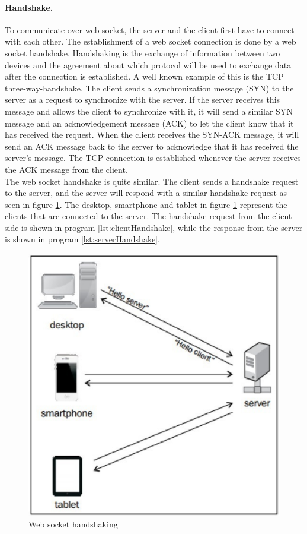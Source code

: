 \documentclass[a4paper, 11pt]{report}
\begin{document}
		\paragraph{Handshake.}
To communicate over web socket, the server and the client first have to connect with each other. The establishment of a web socket connection is done by a web socket handshake. Handshaking is the exchange of information between two devices and the agreement about which protocol will be used to exchange data after the connection is established. A well known example of this is the TCP three-way-handshake. The client sends a synchronization message (SYN) to the server as a request to synchronize with the server. If the server receives this message and allows the client to synchronize with it, it will send a similar SYN message and an acknowledgement message (ACK) to let the client know that it has received the request. When the client receives the SYN-ACK message, it will send an ACK message back to the server to acknowledge that it has received the server's message. The TCP connection is established whenever the server receives the ACK message from the client.\\
The web socket handshake is quite similar. The client sends a handshake request to the server, and the server will respond with a similar handshake request as seen in figure \ref{fig:WebSocketHandshaking}. The desktop, smartphone and tablet in figure \ref{fig:WebSocketHandshaking} represent the clients that are connected to the server. The handshake request from the client-side is shown in program \ref{lst:clientHandshake}, while the response from the server is shown in program \ref{lst:serverHandshake}.
	\begin{figure}[ht]
		\centering
		\includegraphics[scale=0.5]{images/server.pdf}
		\caption{Web socket handshaking}\label{fig:WebSocketHandshaking}
	\end{figure}
\end{document}
